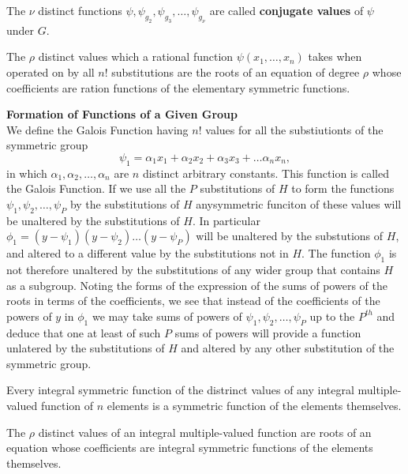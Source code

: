 \begin{definition}
The $\nu$ distinct functions $\psi, \psi_{g_2}, \psi_{g_3}, \hdots, \psi_{g_\nu}$ are called {\bf conjugate values} of $\psi$ under $G$.
\end{definition}

\begin{theorem}
The $\rho$ distinct values which a rational function $\psi(x_1, \hdots, x_n)$ takes when operated on by all $n!$ substitutions are the roots of
an equation of degree $\rho$ whose coefficients are ration functions of the elementary symmetric functions.

\end{theorem}

{\bf Formation of Functions of a Given Group}\\

We define the Galois Function having $n!$ values for all the substiutionts of the symmetric group
\[ \psi_1 = \alpha_1 x_ 1 + \alpha_2 x_ 2 + \alpha_3 x_ 3 + \hdots \alpha_n x_ n,\] in which $\alpha_1, \alpha_2, \hdots, \alpha_n$ are $n$ distinct arbitrary constants. This function is
called the Galois Function. If we use all the $P$ substitutions of $H$ to form the functions $\psi_1, \psi_2, \hdots, \psi_P$ by the substitutions of $H$ anysymmetric funciton of these values will be unaltered by the substitutions of $H$. In particular $\phi_1 = (y-\psi_1)(y-\psi_2)\hdots(y-\psi_P)$ will be unaltered by the substutions of $H$, and altered to a different value by the substitutions not in $H$. The function $\phi_1$ is not therefore unaltered by the substitutions of any wider group that contains $H$ as a subgroup. Noting the forms of the expression of the sums of powers of the roots in terms of the coefficients, we see that instead of the coefficients of the powers of $y$ in $\phi_1$ we may take sums of powers of $\psi_1, \psi_2, \hdots, \psi_P$ up to the $P^{th}$ and deduce that one at least of such $P$ sums of powers will provide a function unlatered by the substitutions of $H$ and altered by any other substitution of the symmetric group.

\begin{theorem}
Every integral symmetric function of the distrinct values of any integral multiple-valued function of $n$ elements is a symmetric function of the elements themselves.
\end{theorem}

\begin{corollary}
The $\rho$ distinct values of an integral multiple-valued function are roots of an equation whose coefficients are integral symmetric functions of the elements themselves.
\end{corollary}

